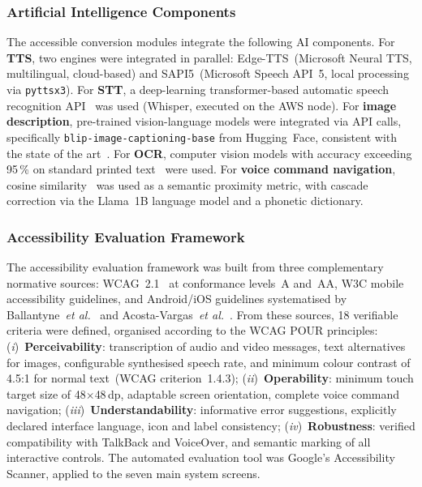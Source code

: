 \documentclass[journal]{IEEEtran}
\begin{document}
	\subsubsection{Artificial Intelligence Components}
	The accessible conversion modules integrate the following AI
	components.
	For \textbf{TTS}, two engines were integrated in parallel:
	Edge-TTS~(Microsoft Neural TTS, multilingual, cloud-based)
	and SAPI5~(Microsoft Speech API~5, local processing via
	\texttt{pyttsx3}).
	For \textbf{STT}, a deep-learning transformer-based automatic
	speech recognition API~\cite{baevski2020,radford2023} was used
	(Whisper, executed on the AWS node).
	For \textbf{image description}, pre-trained
	vision-language models were integrated via API calls, specifically
	\texttt{blip-image-captioning-base} from Hugging~Face,
	consistent with the state of the art~\cite{dognin2021,safiya2024}.
	For \textbf{OCR}, computer vision models with accuracy exceeding
	95\,\% on standard printed text~\cite{mukherjee2023} were used.
	For \textbf{voice command navigation}, cosine
	similarity~\cite{lahitani2016} was used as a semantic proximity
	metric, with cascade correction via the Llama~1B language model
	and a phonetic dictionary.
	
	\subsubsection{Accessibility Evaluation Framework}
	The accessibility evaluation framework was built from three
	complementary normative sources: WCAG~2.1~\cite{w3c2018} at
	conformance levels~A and~AA, W3C mobile accessibility guidelines,
	and Android/iOS guidelines systematised by
	Ballantyne~\textit{et al.}~\cite{ballantyne2018} and
	Acosta-Vargas~\textit{et al.}~\cite{acosta2021}.
	From these sources, 18 verifiable criteria were defined,
	organised according to the WCAG POUR principles:
	(\textit{i})~\textbf{Perceivability}: transcription of audio and
	video messages, text alternatives for images, configurable
	synthesised speech rate, and minimum colour contrast of 4.5:1
	for normal text~(WCAG criterion~1.4.3);
	(\textit{ii})~\textbf{Operability}: minimum touch target size of
	48$\times$48\,dp, adaptable screen orientation, complete voice
	command navigation;
	(\textit{iii})~\textbf{Understandability}: informative error
	suggestions, explicitly declared interface language, icon and
	label consistency;
	(\textit{iv})~\textbf{Robustness}: verified compatibility with
	TalkBack and VoiceOver, and semantic marking of all interactive
	controls.
	The automated evaluation tool was Google's Accessibility Scanner,
	applied to the seven main system screens.
	
\end{document}
